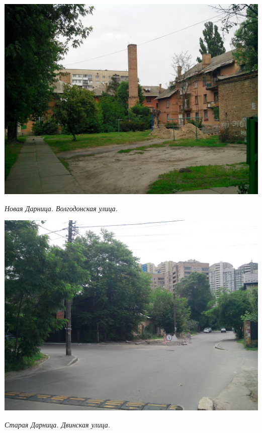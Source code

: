 \begin{center}
\includegraphics[width=\linewidth]{lpix/IMG_20160613_145450.jpg}

\textit{Новая Дарница. Волгодонская улица.}
\end{center}


\begin{center}
\includegraphics[width=\linewidth]{lpix/IMG_20160613_140013.jpg}

\textit{Старая Дарница. Двинская улица.}
\end{center}

